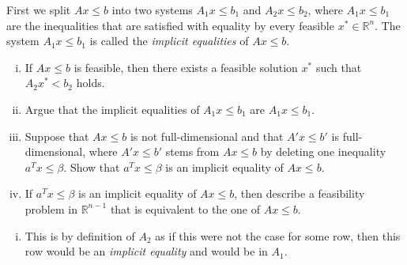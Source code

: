 \documentclass[11pt]{article}
\begin{document}
\begin{enumerate}[1)]
   First we split $Ax ≤ b$ into two systems $A_1x ≤ b_1$ and
   $A_2 x ≤ b_2$, where $A_1x ≤ b_1$ are the inequalities that are
   satisfied with equality by every feasible $x^* ∈ ℝ^n$. The system $A_1 x ≤b_1$ is
   called the \emph{implicit equalities} of $Ax ≤b$.
   \begin{enumerate}[i)] 
   \item If $Ax ≤b$ is feasible, then there exists a feasible solution $x^*$ such that $A_2x^* < b_2$ holds.
     \item Argue that the implicit equalities of $A_1x≤ b_1$ are  $A_1x ≤b_1$. 
   \item Suppose that $Ax ≤ b$ is not full-dimensional and that
     $A'x ≤ b'$ is full-dimensional, where $A'x ≤ b'$ stems from
     $Ax ≤ b$ by deleting one inequality $a^Tx ≤ β$. Show that
     $a^Tx ≤ β$ is an implicit equality of $Ax ≤b$.
   \item If $a^Tx ≤ β$ is an implicit equality of $Ax≤ b$, then describe a feasibility problem in $ℝ^{n-1}$ that is equivalent to the one of $Ax ≤b$. 
   \end{enumerate}
   
   
    \begin{solution}
    \begin{enumerate}[i)]
   \item This is by definition of $A_2$ as if this were not the case for some row, then this row would be an \textit{implicit equality} and would be in $A_1$. 

   \end{enumerate}
   \end{solution}





\end{enumerate}




  
\end{document}
